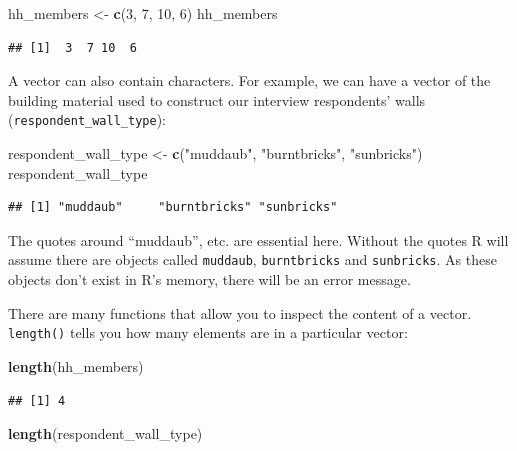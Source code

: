 \documentclass[]{book}
\newenvironment{Shaded}{\begin{snugshade}}{\end{snugshade}}
\newcommand{\KeywordTok}[1]{\textcolor[rgb]{0.13,0.29,0.53}{\textbf{#1}}}
\newcommand{\DecValTok}[1]{\textcolor[rgb]{0.00,0.00,0.81}{#1}}
\newcommand{\StringTok}[1]{\textcolor[rgb]{0.31,0.60,0.02}{#1}}
\newcommand{\NormalTok}[1]{#1}
\begin{document}
\begin{Shaded}
\begin{Highlighting}[]
\NormalTok{hh_members <-}\StringTok{ }\KeywordTok{c}\NormalTok{(}\DecValTok{3}\NormalTok{, }\DecValTok{7}\NormalTok{, }\DecValTok{10}\NormalTok{, }\DecValTok{6}\NormalTok{)}
\NormalTok{hh_members}
\end{Highlighting}
\end{Shaded}

\begin{verbatim}
## [1]  3  7 10  6
\end{verbatim}

A vector can also contain characters. For example, we can have a vector
of the building material used to construct our interview respondents'
walls (\texttt{respondent\_wall\_type}):

\begin{Shaded}
\begin{Highlighting}[]
\NormalTok{respondent_wall_type <-}\StringTok{ }\KeywordTok{c}\NormalTok{(}\StringTok{"muddaub"}\NormalTok{, }\StringTok{"burntbricks"}\NormalTok{, }\StringTok{"sunbricks"}\NormalTok{)}
\NormalTok{respondent_wall_type}
\end{Highlighting}
\end{Shaded}

\begin{verbatim}
## [1] "muddaub"     "burntbricks" "sunbricks"
\end{verbatim}

The quotes around ``muddaub'', etc. are essential here. Without the
quotes R will assume there are objects called \texttt{muddaub},
\texttt{burntbricks} and \texttt{sunbricks}. As these objects don't
exist in R's memory, there will be an error message.

There are many functions that allow you to inspect the content of a
vector. \texttt{length()} tells you how many elements are in a
particular vector:

\begin{Shaded}
\begin{Highlighting}[]
\KeywordTok{length}\NormalTok{(hh_members)}
\end{Highlighting}
\end{Shaded}

\begin{verbatim}
## [1] 4
\end{verbatim}

\begin{Shaded}
\begin{Highlighting}[]
\KeywordTok{length}\NormalTok{(respondent_wall_type)}
\end{Highlighting}
\end{Shaded}
\end{document}
